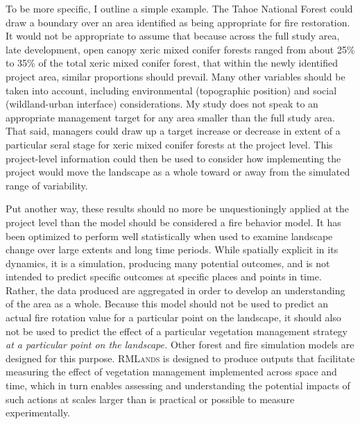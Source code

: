 To be more specific, I outline a simple example. The Tahoe National Forest could draw a boundary over an area identified as being appropriate for fire restoration. It would not be appropriate to assume that because across the full study area, late development, open canopy xeric mixed conifer forests ranged from about 25\% to 35\% of the total xeric mixed conifer forest, that within the newly identified project area, similar proportions should prevail. Many other variables should be taken into account, including environmental (topographic position) and social (wildland-urban interface) considerations. My study does not speak to an appropriate management target for any area smaller than the full study area. That said, managers could draw up a target increase or decrease in extent of a particular seral stage for xeric mixed conifer forests at the project level. This project-level information could then be used to consider how implementing the project would move the landscape as a whole toward or away from the simulated range of variability. 

Put another way, these results should no more be unquestioningly applied at the project level than the model should be considered a fire behavior model. It has been optimized to perform well statistically when used to examine landscape change over large extents and long time periods. While spatially explicit in its dynamics, it is a simulation, producing many potential outcomes, and is not intended to predict specific outcomes at specific places and points in time. Rather, the data produced are aggregated in order to develop an understanding of the area as a whole. Because this model should not be used to predict an actual fire rotation value for a particular point on the landscape, it should also not be used to predict the effect of a particular vegetation management strategy \emph{at a particular point on the landscape.} Other forest and fire simulation models are designed for this purpose. \textsc{RMLands} is designed to produce outputs that facilitate measuring the effect of vegetation management implemented across space and time, which in turn enables assessing and understanding the potential impacts of such actions at scales larger than is practical or possible to measure experimentally.  

